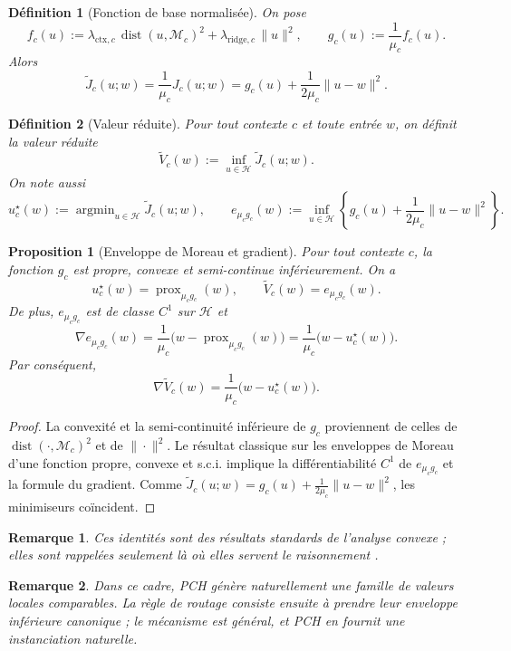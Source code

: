 \documentclass[11pt,a4paper]{article}
\newtheorem{definition}{Définition}[section]
\newtheorem{proposition}{Proposition}[section]
\newtheorem{remark}{Remarque}[section]
\DeclareMathOperator{\prox}{prox}
\DeclareMathOperator{\argmin}{argmin}
\DeclareMathOperator{\dist}{dist}
\newcommand{\Hh}{\mathcal H}
\newcommand{\Mcal}{\mathcal M}
\begin{document}
\begin{definition}[Fonction de base normalisée]
On pose
\[
f_c(u):=\lambda_{\mathrm{ctx},c}\,\dist(u,\Mcal_c)^2+\lambda_{\mathrm{ridge},c}\,\|u\|^2,
\qquad
g_c(u):=\frac{1}{\mu_c}f_c(u).
\]
Alors
\[
\widetilde J_c(u;w)=\frac{1}{\mu_c}J_c(u;w)=g_c(u)+\frac{1}{2\mu_c}\|u-w\|^2.
\]
\end{definition}

\begin{definition}[Valeur réduite]
Pour tout contexte \(c\) et toute entrée \(w\), on définit la valeur réduite
\[
\widetilde V_c(w):=\inf_{u\in\Hh}\widetilde J_c(u;w).
\]
On note aussi
\[
 u_c^\star(w):=\argmin_{u\in\Hh}\widetilde J_c(u;w),
\qquad
 e_{\mu_c g_c}(w):=\inf_{u\in\Hh}\left\{g_c(u)+\frac{1}{2\mu_c}\|u-w\|^2\right\}.
\]
\end{definition}

\begin{proposition}[Enveloppe de Moreau et gradient]
Pour tout contexte \(c\), la fonction \(g_c\) est propre, convexe et semi-continue inférieurement. On a
\[
 u_c^\star(w)=\prox_{\mu_c g_c}(w),
\qquad
 \widetilde V_c(w)=e_{\mu_c g_c}(w).
\]
De plus, \(e_{\mu_c g_c}\) est de classe \(C^1\) sur \(\Hh\) et
\[
\nabla e_{\mu_c g_c}(w)=\frac{1}{\mu_c}\bigl(w-\prox_{\mu_c g_c}(w)\bigr)
=\frac{1}{\mu_c}\bigl(w-u_c^\star(w)\bigr).
\]
Par conséquent,
\[
\nabla \widetilde V_c(w)=\frac{1}{\mu_c}\bigl(w-u_c^\star(w)\bigr).
\]
\end{proposition}

\begin{proof}
La convexité et la semi-continuité inférieure de \(g_c\) proviennent de celles de \(\dist(\cdot,\Mcal_c)^2\) et de \(\|\cdot\|^2\). Le résultat classique sur les enveloppes de Moreau d'une fonction propre, convexe et s.c.i. implique la différentiabilité \(C^1\) de \(e_{\mu_c g_c}\) et la formule du gradient. Comme \(\widetilde J_c(u;w)=g_c(u)+\frac{1}{2\mu_c}\|u-w\|^2\), les minimiseurs coïncident.
\end{proof}

\begin{remark}
Ces identités sont des résultats standards de l'analyse convexe ; elles sont rappelées seulement là où elles servent le raisonnement \cite{Moreau1965,Rockafellar1970,BauschkeCombettes2017,RockafellarWets1998}.
\end{remark}

\begin{remark}
Dans ce cadre, PCH génère naturellement une famille de valeurs locales comparables. La règle de routage consiste ensuite à prendre leur enveloppe inférieure canonique ; le mécanisme est général, et PCH en fournit une instanciation naturelle.
\end{remark}
\end{document}
